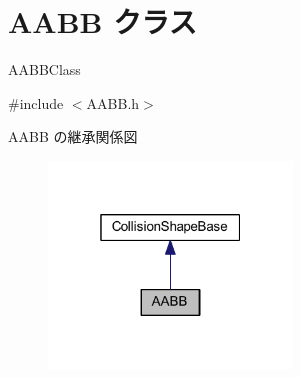 \hypertarget{class_a_a_b_b}{}\section{A\+A\+BB クラス}
\label{class_a_a_b_b}


A\+A\+B\+B\+Class  




{\ttfamily \#include $<$A\+A\+B\+B.\+h$>$}



A\+A\+BB の継承関係図\nopagebreak
\begin{figure}[H]
\begin{center}
\leavevmode
\includegraphics[width=184pt]{class_a_a_b_b__inherit__graph}
\end{center}
\end{figure}
